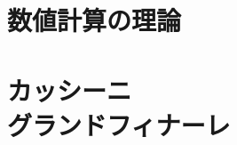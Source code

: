 \documentclass[b5paper]{ujreport}
\begin{document}




\chapter{数値計算の理論}




\chapter{カッシーニ\\グランドフィナーレ}









\end{document}
